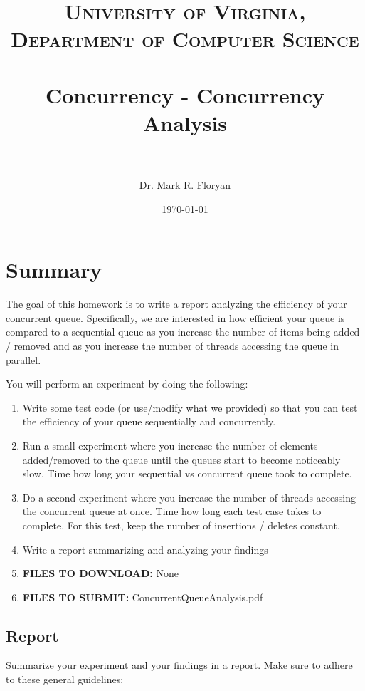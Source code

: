 \documentclass[paper=a4, fontsize=11pt, parskip=full]{scrartcl} %
\title{
\normalfont \normalsize
\textsc{University of Virginia, Department of Computer Science} \\ [25pt] %
\horrule{0.5pt} \\[0.4cm] %
\huge Concurrency - Concurrency Analysis \\ %
\horrule{2pt} \\[0.5cm] %
}
\author{Dr. Mark R. Floryan} %
\date{\normalsize\today} %
\numberwithin{equation}{section} %
\numberwithin{figure}{section} %
\numberwithin{table}{section} %
\begin{document}
\maketitle %




\section{Summary}

The goal of this homework is to write a report analyzing the efficiency of your concurrent queue. Specifically, we are interested in how efficient your queue is compared to a sequential queue as you increase the number of items being added / removed and as you increase the number of threads accessing the queue in parallel.

You will perform an experiment by doing the following:

\begin{enumerate}
	\item Write some test code (or use/modify what we provided) so that you can test the efficiency of your queue sequentially and concurrently.
	\item Run a small experiment where you increase the number of elements added/removed to the queue until the queues start to become noticeably slow. Time how long your sequential vs concurrent queue took to complete.
	\item Do a second experiment where you increase the number of threads accessing the concurrent queue at once. Time how long each test case takes to complete. For this test, keep the number of insertions / deletes constant.
	\item Write a report summarizing and analyzing your findings
	\item \textbf{FILES TO DOWNLOAD:} None
	\item \textbf{FILES TO SUBMIT:} ConcurrentQueueAnalysis.pdf
\end{enumerate}

\subsection{Report}

Summarize your experiment and your findings in a report. Make sure to adhere to these general guidelines:
\end{document}
